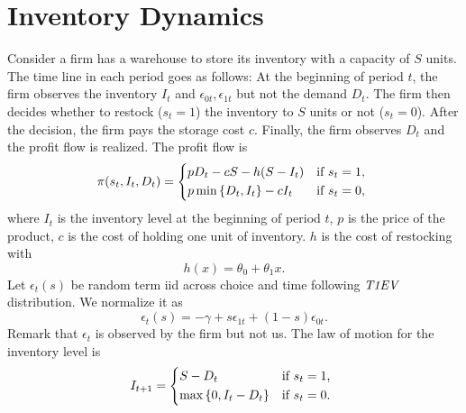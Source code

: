 \documentclass[12pt]{article}
\begin{document}
\section{Inventory Dynamics}
Consider a firm has a warehouse to store its inventory with 
a capacity of $S$ units. The time line in each period goes as follows: 
At the beginning of period $t$, the firm observes the inventory $I_t$ and 
$\epsilon_{0t}, \epsilon_{1t}$ but not the demand $D_t$. The firm then decides 
whether to restock ($s_t = 1$) the inventory to $S$ units or not ($s_t = 0$). 
After the decision, the firm pays the storage cost $c$. Finally, the firm 
observes $D_t$ and the profit flow is realized. The profit flow is 
\begin{equation*}
    \pi(s_t, I_t, D_t) = 
    \begin{cases*}
        pD_t - cS - h(S - I_t)  & if $s_t = 1$, \\
        p\min\brc{D_t, I_t} - cI_t  & if $s_t = 0$,
    \end{cases*}
\end{equation*}  
where $I_t$ is the inventory level at the beginning of period $t$, 
$p$ is the price of the product, $c$ is the cost of holding one unit 
of inventory. $h$ is the cost of restocking with 
\begin{equation*}
    h(x) = \theta_0 + \theta_1x.
\end{equation*}
Let $\epsilon_t(s)$ be random term iid across choice and 
time following $\it{T1EV}$ distribution. We normalize it as 
\begin{equation*}
    \epsilon_t(s) = -\gamma + s\epsilon_{1t} + (1-s)\epsilon_{0t}.
\end{equation*}
Remark that $\epsilon_t$ is observed by the firm but not us.
The law of motion for the inventory level is 
\begin{equation*}
    I_{t+1} = 
    \begin{cases*}
        S - D_t & if $s_t = 1$, \\
        \max\brc{0,I_t - D_t} & if $s_t = 0$.
    \end{cases*}
\end{equation*}
\end{document}

